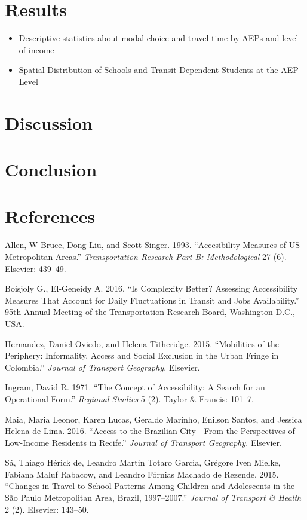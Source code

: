 \documentclass[]{article}
\providecommand{\tightlist}{%
  \setlength{\itemsep}{0pt}\setlength{\parskip}{0pt}}
\begin{document}
\section{Results}\label{results}

\begin{itemize}
\tightlist
\item
  Descriptive statistics about modal choice and travel time by AEPs and
  level of income
\item
  Spatial Distribution of Schools and Transit-Dependent Students at the
  AEP Level
\end{itemize}

\section{Discussion}\label{discussion}

\section{Conclusion}\label{conclusion}

\section{References}\label{references}

Allen, W Bruce, Dong Liu, and Scott Singer. 1993. ``Accesibility
Measures of US Metropolitan Areas.'' \emph{Transportation Research Part
B: Methodological} 27 (6). Elsevier: 439--49.

Boisjoly G., El-Geneidy A. 2016. ``Is Complexity Better? Assessing
Accessibility Measures That Account for Daily Fluctuations in Transit
and Jobs Availability.'' 95th Annual Meeting of the Transportation
Research Board, Washington D.C., USA.

Hernandez, Daniel Oviedo, and Helena Titheridge. 2015. ``Mobilities of
the Periphery: Informality, Access and Social Exclusion in the Urban
Fringe in Colombia.'' \emph{Journal of Transport Geography}. Elsevier.

Ingram, David R. 1971. ``The Concept of Accessibility: A Search for an
Operational Form.'' \emph{Regional Studies} 5 (2). Taylor \& Francis:
101--7.

Maia, Maria Leonor, Karen Lucas, Geraldo Marinho, Enilson Santos, and
Jessica Helena de Lima. 2016. ``Access to the Brazilian City---From the
Perspectives of Low-Income Residents in Recife.'' \emph{Journal of
Transport Geography}. Elsevier.

Sá, Thiago Hérick de, Leandro Martin Totaro Garcia, Grégore Iven Mielke,
Fabiana Maluf Rabacow, and Leandro Fórnias Machado de Rezende. 2015.
``Changes in Travel to School Patterns Among Children and Adolescents in
the São Paulo Metropolitan Area, Brazil, 1997--2007.'' \emph{Journal of
Transport \& Health} 2 (2). Elsevier: 143--50.
\end{document}
